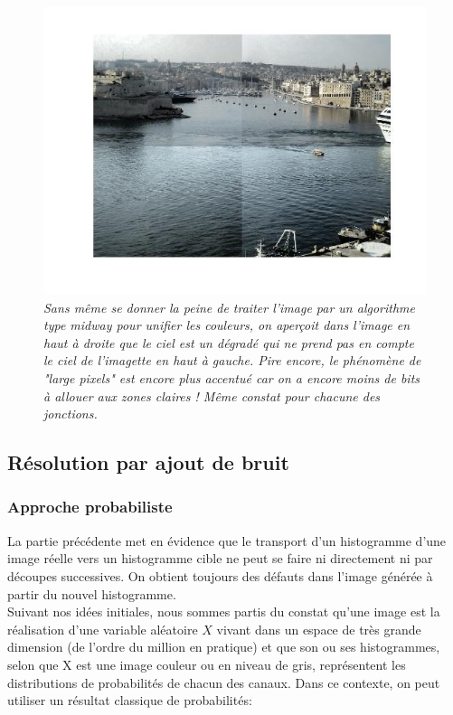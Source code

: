 \documentclass{article}
\begin{document}
\begin{figure}
\centering
\includegraphics[scale=0.75]{images/p2_tilling.jpg}
\caption{\textit{Sans même se donner la peine de traiter l'image par un algorithme type midway pour unifier les couleurs, on aperçoit dans l'image en haut à droite que le ciel est un dégradé qui ne prend pas en compte le ciel de l'imagette en haut à gauche. Pire encore, le phénomène de "large pixels" est encore plus accentué car on a encore moins de bits à allouer aux zones claires ! Même constat pour chacune des jonctions.}}
\label{fig:tilling}
\end{figure}
\FloatBarrier

\subsection{Résolution par ajout de bruit}
\subsubsection*{Approche probabiliste}
La partie précédente met en évidence que le transport d'un histogramme d'une image réelle vers un histogramme cible ne peut se faire ni directement ni par découpes successives. On obtient toujours des défauts dans l'image générée à partir du nouvel histogramme.\\
Suivant nos idées initiales, nous sommes partis du constat qu'une image est la réalisation d'une variable aléatoire $X$ vivant dans un espace de très grande dimension (de l'ordre du million en pratique) et que son ou ses histogrammes, selon que X est une image couleur ou en niveau de gris, représentent les distributions de probabilités de chacun des canaux. Dans ce contexte, on peut utiliser un résultat classique de probabilités:
\end{document}
